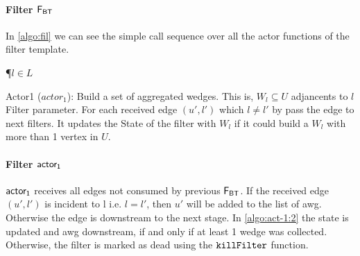 \paragraph{Filter $\mathsf{F_{BT}}$} In \autoref{algo:fil} we can see the simple call sequence over all the actor functions of the filter template. 

\begin{algorithm}[h!]
\SetAlgoRefName{[A5]}
\P{$l \in L$}
\BlankLine
{}
\caption[Actor1 ($actor_1$)]{Actor1 ($actor_1$): Build a set of aggregated wedges. This is, $W_l \subseteq U$ adjancents to $l$ Filter parameter. For each received edge $(u',l')$ which $l \neq l'$ by pass the edge to next filters. It updates the State of the filter with $W_l$ if it could build a $W_l$ with more than 1 vertex in $U$.}
\label{algo:act-1}
\end{algorithm}

\paragraph{Filter $\mathsf{actor_1}$} 
$\mathsf{actor_1}$ receives all edges not consumed by previous $\mathsf{F_{BT}}$.
If the received edge $(u',l')$ is incident to l i.e. $l = l'$,  then $u'$ will be added to the list of \acrshort{awg}. Otherwise the edge is downstream to the next stage.
In \autoref{algo:act-1:2} the state is updated and \acrshort{awg} downstream, if and only if at least 1 wedge was collected. Otherwise, the filter is marked as dead using the  $\mathtt{killFilter}$ function.

